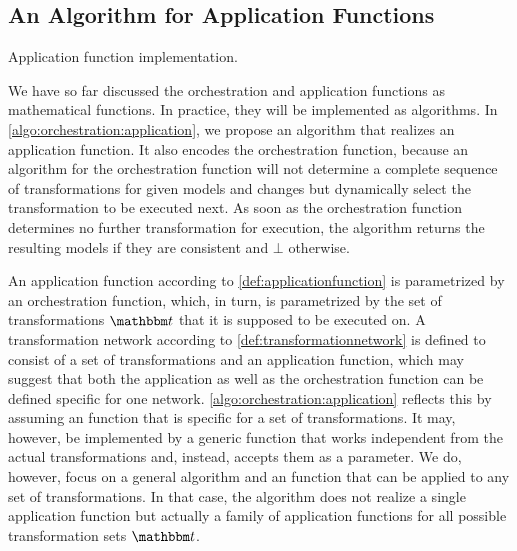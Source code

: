 \subsection{An Algorithm for Application Functions}
\label{chap:orchestration:decidability:algorithm}

\newcommand{\applyalgexecuted}{\sequence{\transformation{t}_{\mathvariable{executed}}}}
\newcommand{\applyalggenerated}{\sequence{\changetuple{\metamodeltuple{M}, \mathvariable{generated}}}}
\begin{algorithm}
    
    \caption[Application function implementation]{Application function implementation.}
    \label{algo:orchestration:application}
\end{algorithm}

We have so far discussed the orchestration and application functions as mathematical functions.
In practice, they will be implemented as algorithms.
In \autoref{algo:orchestration:application}, we propose an algorithm that realizes an application function.
It also encodes the orchestration function, because an algorithm for the orchestration function will not determine a complete sequence of transformations for given models and changes but dynamically select the transformation to be executed next.
As soon as the orchestration function determines no further transformation for execution, the algorithm returns the resulting models if they are consistent and $\bot$ otherwise.

An application function according to \autoref{def:applicationfunction} is parametrized by an orchestration function, which, in turn, is parametrized by the set of transformations $\transformationset{T}$ that it is supposed to be executed on.
A transformation network according to \autoref{def:transformationnetwork} is defined to consist of a set of transformations and an application function, which may suggest that both the application as well as the orchestration function can be defined specific for one network.
\autoref{algo:orchestration:application} reflects this by assuming an  function that is specific for a set of transformations.
It may, however, be implemented by a generic function that works independent from the actual transformations and, instead, accepts them as a parameter.
We do, however, focus on a general algorithm and an  function that can be applied to any set of transformations.
In that case, the algorithm does not realize a single application function but actually a family of application functions for all possible transformation sets $\transformationset{T}$.

